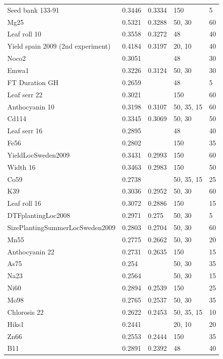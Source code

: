 \begin{longtable}{p{} p{} p{} p{} p{}}
  Seed bank 133-91 & 0.3446 & 0.3334 & 150 & 5 \\
  Mg25 & 0.5321 & 0.3288 & 50, 30 & 60 \\
  Leaf roll 10 & 0.3558 & 0.3272 & 48 & 40 \\
  Yield spain 2009 (2nd experiment) & 0.4184 & 0.3197 & 20, 10 & 40 \\
  Noco2 & 0.3051 & \color{red}{0.3174} & 48 & 30 \\
  Emwa1 & 0.3226 & 0.3124 & 50, 30 & 30 \\
  FT Duration GH & 0.2659 & \color{red}{0.3123} & 48 & 5 \\
  Leaf serr 22 & 0.3021 & \color{red}{0.3108} & 150 & 60 \\
  Anthocyanin 10 & 0.3198 & 0.3107 & 50, 35, 15 & 60 \\
  Cd114 & 0.3345 & 0.3069 & 50, 30 & 50 \\
  Leaf serr 16 & 0.2895 & \color{red}{0.3011} & 48 & 40 \\
  Fe56 & 0.2802 & \color{red}{0.3006} & 150 & 35 \\
  YieldLocSweden2009 & 0.3431 & 0.2993 & 150 & 60 \\
  Width 16 & 0.3463 & 0.2983 & 150 & 50 \\
  Co59 & 0.2738 & \color{red}{0.2953} & 50, 35, 15 & 25 \\
  K39 & 0.3036 & 0.2952 & 50, 30 & 60 \\
  Leaf roll 16 & 0.3072 & 0.2886 & 150 & 15 \\
  DTFplantingLoc2008 & 0.2971 & 0.275 & 50, 30 & 5 \\
  SizePlantingSummerLocSweden2009 & 0.2803 & 0.2704 & 50, 30 & 60 \\
  Mn55 & 0.2775 & 0.2662 & 50, 30 & 20 \\
  Anthocyanin 22 & 0.2731 & 0.2635 & 150 & 15 \\
  As75 & 0.254 & \color{red}{0.2619} & 50, 30 & 35 \\
  Na23 & 0.2564 & \color{red}{0.2598} & 50, 30 & 15 \\
  Ni60 & 0.2894 & 0.2539 & 150 & 25 \\
  Mo98 & 0.2765 & 0.2537 & 50, 30 & 35 \\
  Chlorosis 22 & 0.2622 & 0.2453 & 50, 35, 15 & 10 \\
  Hiks1 & 0.2441 & \color{red}{0.2452} & 20, 10 & 20 \\
  Zn66 & 0.2553 & 0.2444 & 150 & 35 \\
  B11 & 0.2891 & 0.2392 & 48 & 40 \\

\end{longtable}
